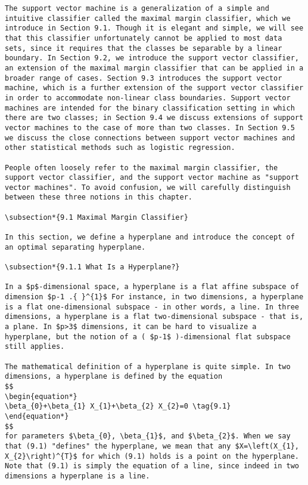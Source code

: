 \documentclass[10pt]{article}
\begin{document}
\begin{verbatim}
The support vector machine is a generalization of a simple and intuitive classifier called the maximal margin classifier, which we introduce in Section 9.1. Though it is elegant and simple, we will see that this classifier unfortunately cannot be applied to most data sets, since it requires that the classes be separable by a linear boundary. In Section 9.2, we introduce the support vector classifier, an extension of the maximal margin classifier that can be applied in a broader range of cases. Section 9.3 introduces the support vector machine, which is a further extension of the support vector classifier in order to accommodate non-linear class boundaries. Support vector machines are intended for the binary classification setting in which there are two classes; in Section 9.4 we discuss extensions of support vector machines to the case of more than two classes. In Section 9.5 we discuss the close connections between support vector machines and other statistical methods such as logistic regression.

People often loosely refer to the maximal margin classifier, the support vector classifier, and the support vector machine as "support vector machines". To avoid confusion, we will carefully distinguish between these three notions in this chapter.

\subsection*{9.1 Maximal Margin Classifier}

In this section, we define a hyperplane and introduce the concept of an optimal separating hyperplane.

\subsection*{9.1.1 What Is a Hyperplane?}

In a $p$-dimensional space, a hyperplane is a flat affine subspace of dimension $p-1 .{ }^{1}$ For instance, in two dimensions, a hyperplane is a flat one-dimensional subspace - in other words, a line. In three dimensions, a hyperplane is a flat two-dimensional subspace - that is, a plane. In $p>3$ dimensions, it can be hard to visualize a hyperplane, but the notion of a ( $p-1$ )-dimensional flat subspace still applies.

The mathematical definition of a hyperplane is quite simple. In two dimensions, a hyperplane is defined by the equation
$$
\begin{equation*}
\beta_{0}+\beta_{1} X_{1}+\beta_{2} X_{2}=0 \tag{9.1}
\end{equation*}
$$
for parameters $\beta_{0}, \beta_{1}$, and $\beta_{2}$. When we say that (9.1) "defines" the hyperplane, we mean that any $X=\left(X_{1}, X_{2}\right)^{T}$ for which (9.1) holds is a point on the hyperplane. Note that (9.1) is simply the equation of a line, since indeed in two dimensions a hyperplane is a line.


\end{verbatim}
\end{document}

